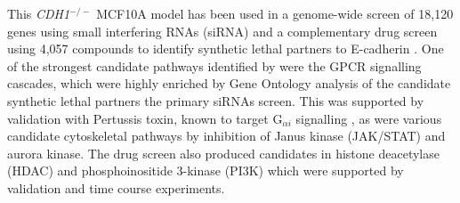 This \textit{CDH1}$^{-/-}$  MCF10A model has been used in a genome-wide screen of 18,120 genes using small interfering RNAs (siRNA) and a complementary drug screen using 4,057 compounds to identify synthetic lethal partners to E-cadherin \citep{Telford2015}. One of the strongest candidate pathways identified by \citet{Telford2015} were the GPCR signalling cascades, which were highly enriched by Gene Ontology analysis of the candidate synthetic lethal partners the primary siRNAs screen. This was supported by validation with Pertussis toxin, known to target  G$_{\alpha i}$ signalling \citep{Clark2004}, as were various candidate cytoskeletal pathways by inhibition of Janus kinase (JAK/STAT) and aurora kinase. The drug screen also produced candidates in histone deacetylase (HDAC) and phosphoinositide 3-kinase (PI3K) which were supported by validation and time course experiments.



